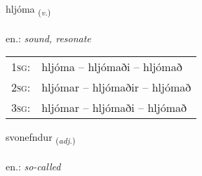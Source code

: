 \documentclass[frontgrid, backgrid]{flacards}\usepackage[]{graphicx}\usepackage[]{xcolor}
\begin{document}
\renewcommand{\flhead}{\vskip5pt \fboxsep=0pt {\small\bfseries\footnotesize Sagnorð | Verb}}
\renewcommand{\fcfoot}{\vskip5pt \fboxsep=0pt \hspace{2pt}{\small\bfseries\footnotesize 2K}}

\renewcommand{\blhead}{\vskip5pt {\small\bfseries\footnotesize Sagnorð | Verb }}
\renewcommand{\bcfoot}{\vskip5pt \hspace{2pt}{\small\bfseries\footnotesize 2K}}


{hljóma \small{\textsubscript{(\textit{v.})}} \\[1ex] %
\textphonetic{[l̥jouːma]} \\
en.: \emph{sound, resonate} \\  [2ex]
\renewcommand*{\arraystretch}{0.8}
\begin{tabular}{p{1cm}l}
\textsc{1sg}: & hljóma -- hljómaði -- hljómað \\ 
\textsc{2sg}: & hljómar -- hljómaðir -- hljómað \\ 
\textsc{3sg}: & hljómar -- hljómaði -- hljómað \\ 
\end{tabular}
}

\renewcommand{\flhead}{\vskip5pt \fboxsep=0pt {\small\bfseries\footnotesize Lýsingarorð | Adjective}}
\renewcommand{\fcfoot}{\vskip5pt \fboxsep=0pt \hspace{2pt}{\small\bfseries\footnotesize 2K}}

\renewcommand{\blhead}{\vskip5pt {\small\bfseries\footnotesize Lýsingarorð | Adjective }}
\renewcommand{\bcfoot}{\vskip5pt \hspace{2pt}{\small\bfseries\footnotesize 2K}}


{svonefndur \small{\textsubscript{(\textit{adj.})}} \\[1ex] %
\textphonetic{[svɔnɛmtʏr]} \\
en.: \emph{so-called} \\  [2ex]
\renewcommand*{\arraystretch}{0.8}
}
\end{document}
